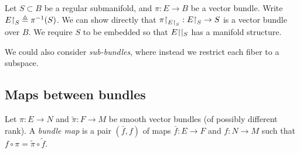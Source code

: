 \begin{xmpl}
Let $S \subset B$ be a regular submanifold, and
$\pi: E \to B$ be a vector bundle. Write
$E\mathord{\upharpoonright}_S \triangleq \pi^{-1}(S)$. We can show directly that
$\pi\mathord{\upharpoonright}_{E\mathord{\upharpoonright}_{S}}: E\mathord{\upharpoonright}_S \to S$ is a vector bundle
over $B$. We require $S$ to be embedded so that $E\mathord{\upharpoonright}|_S$ has a
manifold structure.
\end{xmpl}

We could also consider \emph{sub-bundles}, where instead we restrict
each fiber to a subspace.

\subsection{Maps between bundles}
\begin{defn}
Let $\pi: E \to N$ and $\tilde{\pi}: F \to M$ be smooth vector bundles
(of possibly different rank). A \emph{bundle map} is a pair
$(\bar{f}, f)$ of maps $\bar{f}: E \to F$ and $f: N \to M$ such that
$f \circ \pi = \tilde{\pi} \circ \tilde{f}$.

\end{defn}
